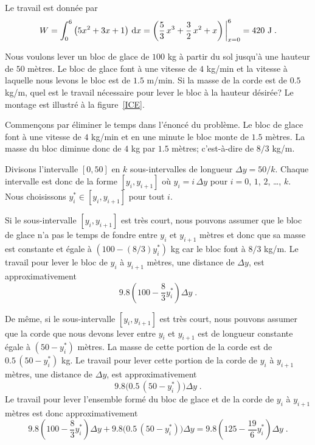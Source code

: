 {\begin{egg}
Le travail est donnée par
\[
W = \int_0^6 \left(5x^2 + 3x + 1\right) \,\mathrm{d}x
= \left(\frac{5}{3}\,x^3
+ \frac{3}{2}\, x^2 + x\right)\bigg|_{x=0}^6 = 420\ \text{J} \; .
\]
\end{egg}


\begin{egg}
Nous voulons lever un bloc de glace de $100$ kg à partir du sol jusqu'à une
hauteur de $50$ mètres.  Le bloc de glace font à une vitesse de $4$ kg/min et
la vitesse à laquelle nous levons le bloc est de $1.5$ m/min.  Si la
masse de la corde est de $0.5$ kg/m, quel est le travail nécessaire
pour lever le bloc à la hauteur désirée?  Le montage est illustré à la
figure~\ref{ICE}.

Commençons par éliminer le temps dans l'énoncé du problème.  Le bloc de glace
font à une vitesse de $4$ kg/min et en une minute le bloc monte de $1.5$
mètres.  La masse du bloc diminue donc de $4$ kg par $1.5$ mètres;
c'est-à-dire de $8/3$ kg/m. 

Divisons l'intervalle $[0,50]$ en $k$ sous-intervalles de longueur
$\Delta y = 50/k$.  Chaque intervalle est donc de la forme $[y_i,y_{i+1}]$ où
$y_i= i\,\Delta y$ pour $i=0$, $1$, $2$, \ldots, $k$.  Nous choisissons
$y_i^\ast \in [y_i,y_{i+1}]$ pour tout $i$.

Si le sous-intervalle $[y_i,y_{i+1}]$ est très court, nous pouvons
assumer que le bloc de glace n'a pas le temps de fondre entre $y_i$ et
$y_{i+1}$ mètres et donc que sa masse est constante et égale à
$\left(100- (8/3) y_i^\ast\right)$ kg car le bloc font à $8/3$
kg/m.  Le travail pour lever le bloc de $y_i$ à
$y_{i+1}$ mètres, une distance de $\Delta y$, est approximativement 
\[
9.8 \left(100- \frac{8}{3} y_i^\ast\right) \Delta y \; .
\]

De même, si le sous-intervalle $[y_i,y_{i+1}]$ est très court, nous pouvons
assumer que la corde que nous devons lever entre $y_i$ et $y_{i+1}$ est de
longueur constante égale à $(50-y_i^\ast)$ mètres.  La masse de cette
portion de la corde est de $0.5\,(50-y_i^\ast)$ kg.  Le travail pour
lever cette portion de la corde de $y_i$ à $y_{i+1}$ mètres, une
distance de $\Delta y$, est approximativement
\[
9.8  \big( 0.5\,(50-y_i^\ast)\big) \Delta y \; .
\]
Le travail pour lever l'ensemble formé du bloc de glace et de la corde
de $y_i$ à $y_{i+1}$ mètres est donc approximativement
\[
9.8 \left(100- \frac{8}{3} y_i^\ast\right) \Delta y +
9.8 \big( 0.5\,(50-y_i^\ast) \big)\Delta y
= 9.8 \left(125-\frac{19}{6} y_i^\ast \right) \Delta y \; .
\]


\end{egg}}
